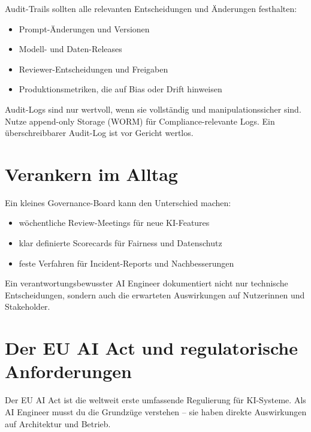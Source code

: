Audit-Trails sollten alle relevanten Entscheidungen und Änderungen festhalten:

\begin{itemize}[leftmargin=*]
    \item Prompt-Änderungen und Versionen
    \item Modell- und Daten-Releases
    \item Reviewer-Entscheidungen und Freigaben
    \item Produktionsmetriken, die auf Bias oder Drift hinweisen
\end{itemize}

\begin{praxishinweis}
Audit-Logs sind nur wertvoll, wenn sie vollständig und manipulationssicher sind. Nutze append-only Storage (WORM) für Compliance-relevante Logs. Ein überschreibbarer Audit-Log ist vor Gericht wertlos.
\end{praxishinweis}

\section{Verankern im Alltag}

Ein kleines Governance-Board kann den Unterschied machen:

\begin{itemize}[leftmargin=*]
    \item wöchentliche Review-Meetings für neue KI-Features
    \item klar definierte Scorecards für Fairness und Datenschutz
    \item feste Verfahren für Incident-Reports und Nachbesserungen
\end{itemize}

Ein verantwortungsbewusster AI Engineer dokumentiert nicht nur technische Entscheidungen, sondern auch die erwarteten Auswirkungen auf Nutzerinnen und Stakeholder.

\section{Der EU AI Act und regulatorische Anforderungen}

Der EU AI Act ist die weltweit erste umfassende Regulierung für KI-Systeme. Als AI Engineer musst du die Grundzüge verstehen -- sie haben direkte Auswirkungen auf Architektur und Betrieb.

